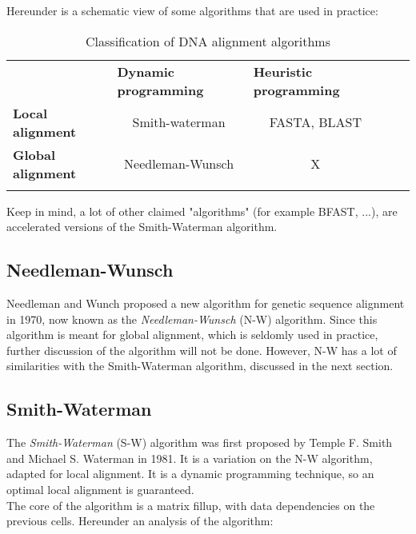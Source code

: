 Hereunder is a schematic view of some algorithms that are used in practice:

\begin{table}[H]
	\begin{tabular}{lllll}
		\cline{1-3}
		\multicolumn{1}{|l|}{}                          & \multicolumn{1}{l|}{\textbf{Dynamic programming}} & \multicolumn{1}{l|}{\textbf{Heuristic programming}} &  &  \\ \cline{1-3}
		\multicolumn{1}{|l|}{\textbf{Local alignment}}  & \multicolumn{1}{c|}{Smith-waterman}               & \multicolumn{1}{c|}{FASTA, BLAST}                   &  &  \\ \cline{1-3}
		\multicolumn{1}{|l|}{\textbf{Global alignment}} & \multicolumn{1}{c|}{Needleman-Wunsch}             & \multicolumn{1}{c|}{X}                              &  &  \\ \cline{1-3}
		&                                                   &                                                     &  & 
	\end{tabular}
	\caption{Classification of DNA alignment algorithms}
\end{table}


Keep in mind, a lot of other claimed "algorithms" (for example BFAST, ...), are accelerated versions of the Smith-Waterman algorithm.

\subsection{Needleman-Wunsch}
Needleman and Wunch proposed a new algorithm for genetic sequence alignment in 1970, now known as the \emph{Needleman-Wunsch} (N-W) algorithm. Since this algorithm is meant for global alignment, which is seldomly used in practice, further discussion of the algorithm will not be done. However, N-W has a lot of similarities with the Smith-Waterman algorithm, discussed in the next section.

\subsection{Smith-Waterman}
\label{expl:SWanalyse}
The \emph{Smith-Waterman} (S-W) algorithm was first proposed by Temple F. Smith and Michael S. Waterman in 1981. It is a variation on the N-W algorithm, adapted for local alignment. It is a dynamic programming technique, so an optimal local alignment is guaranteed. \\

The core of the algorithm is a matrix fillup, with data dependencies on the previous cells. Hereunder an analysis of the algorithm:

